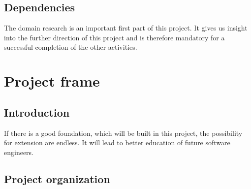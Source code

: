 \documentclass{article}
\begin{document}
\subsection{Dependencies} 

The domain research is an important first part of this project. It 
gives us insight into the further direction of this project and is therefore 
mandatory for a successful completion of the other activities. 

\section{Project frame} 

\subsection{Introduction} 

If there is a good foundation, which will be built in this project, the 
possibility for extension are endless. It will lead to better education of 
future software engineers. 

\subsection{Project organization} 
\end{document}
